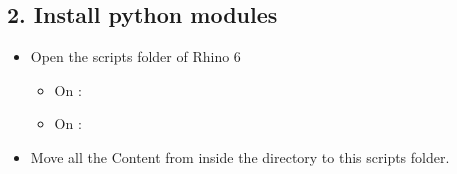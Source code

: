 \documentclass[letterpaper,10pt,english]{sphinxmanual}
\begin{document}
\subsection{2. Install python modules}
\label{\detokenize{README:install-python-modules}}\label{\detokenize{README:id3}}\begin{itemize}
\item {} 
Open the scripts folder of Rhino 6
\begin{itemize}
\item {} 
On :

\item {} 
On : 

\end{itemize}

\item {} 
Move all the Content from inside the  directory to this
scripts folder.

\end{itemize}
\end{document}
